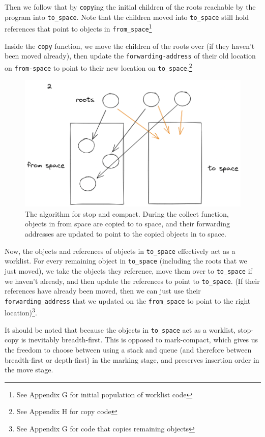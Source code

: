 \documentclass[index]{subfiles}
\begin{document}
Then we follow that by \verb+copy+ing the initial children of the roots reachable by the program into \verb+to_space+. Note that the children moved into \verb+to_space+ still hold references that point to objects in \verb+from_space+\footnote{See Appendix G for initial population of worklist code}

Inside the \verb+copy+ function, we move the children of the roots over (if they haven't been moved already), then update the \verb+forwarding-address+ of their old location on \verb+from-space+ to point to their new location on \verb+to_space+.\footnote{See Appendix H for copy code}

\begin{figure}[H]
    \centering
    \includegraphics[scale=0.3]{pics/visualization-of-worklist.png}
    \caption{The algorithm for stop and compact. During the collect function, objects in from space are copied to to space, and their forwarding addresses are updated to point to the copied objects in to space.}
\end{figure}

Now, the objects and references of objects in \verb+to_space+ effectively act as a worklist. For every remaining object in \verb+to_space+ (including the roots that we just moved), we take the objects they reference, move them over to \verb+to_space+ if we haven't already, and then update the references to point to \verb+to_space+. (If their references have already been moved, then we can just use their \verb+forwarding_address+ that we updated on the \verb+from_space+ to point to the right location)\footnote{See Appendix G for code that copies remaining objects}.

It should be noted that because the objects in \verb+to_space+ act as a worklist, stop-copy is inevitably breadth-first. This is opposed to mark-compact, which gives us the freedom to choose between using a stack and queue (and therefore between breadth-first or depth-first) in the marking stage, and preserves insertion order in the move stage.
\end{document}
